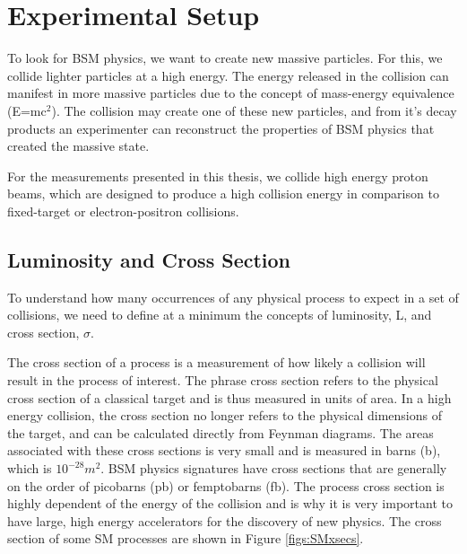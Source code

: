 
\chapter{Experimental Setup}
\label{sec:ExpSetup}
To look for BSM physics, we want to create new massive particles.  
For this, we collide lighter particles at a high energy.  
The energy released in the collision can manifest in more massive particles due to the concept of mass-energy equivalence (E=m$\mathrm{c^2}$).
The collision may create one of these new particles, and from it's decay products an experimenter can reconstruct the properties of BSM physics that created the massive state.  

For the measurements presented in this thesis, we collide high energy proton beams,  
which are designed to produce a high collision energy in comparison to fixed-target or electron-positron collisions.    
   
\section{Luminosity and Cross Section}
\label{sec:LumiXsec}
To understand how many occurrences of any physical process to expect in a set of collisions, we need to define at a minimum the concepts of luminosity, L, and cross section, $\sigma$.

The cross section of a process is a measurement of how likely a collision will result in the process of interest.  
The phrase cross section refers to the physical cross section of a classical target and is thus measured in units of area.  
In a high energy collision, the cross section no longer refers to the physical dimensions of the target, and can be calculated directly from Feynman diagrams.  
The areas associated with these cross sections is very small and is measured in barns (b), which is $10^{-28} m^2$.  
BSM physics signatures have cross sections that are generally on the order of picobarns (pb) or femptobarns (fb).  
The process cross section is highly dependent of the energy of the collision and is why it is very important to have large, high energy accelerators for the discovery of new physics.  
The cross section of some SM processes are shown in Figure \ref{figs:SMxsecs}.


